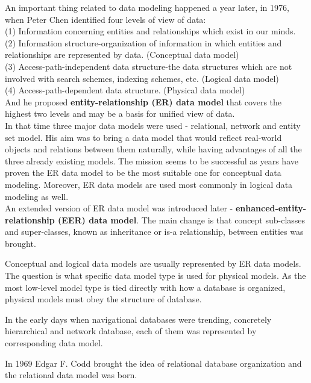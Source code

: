 An important thing related to data modeling happened a year later, in 1976, when Peter Chen identified four levels of view of data: \\
(1) Information concerning entities and relationships which exist in our minds. \\
(2) Information structure-organization of information in which entities and relationships are represented by data. (Conceptual data model) \\
(3) Access-path-independent data structure-the data structures which are not involved with search schemes, indexing schemes, etc. (Logical data model) \\
(4) Access-path-dependent data structure. (Physical data model)\\
And he proposed \textbf{entity-relationship (ER) data model} that covers the highest two levels and may be a basis for unified view of data. \\
In that time three major data models were used - relational, network and entity set model. His aim was to bring a data model that would reflect real-world objects and relations between them naturally, while having advantages of all the three already existing models. The mission seems to be successful as years have proven the ER data model to be the most suitable one for conceptual data modeling. Moreover, ER data models are used most commonly in logical data modeling as well. \\
An extended version of ER data model was introduced later - \textbf{enhanced-entity-relationship (EER) data model}. The main change is that concept sub-classes and super-classes, known as inheritance or is-a relationship, between entities was brought.

Conceptual and logical data models are usually represented by ER data models. The question is what specific data model type is used for physical models. 
As the most low-level model type is tied directly with how a database is organized, physical models must obey the structure of database.

In the early days when navigational databases were trending, concretely hierarchical and network database, each of them was represented by corresponding data model. 

In 1969 Edgar F. Codd  brought the idea of relational database organization and the relational data model was born. 

